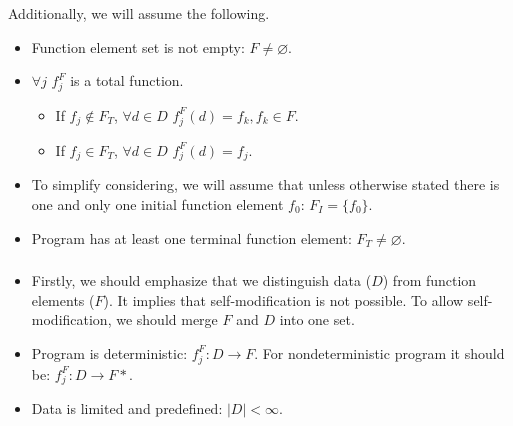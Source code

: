 \documentclass[oneside,a4paper]{article}  %
\newcommand{\subsublevel}{\subsubsection}
\newcommand{\ra}{\rightarrow}
\begin{document}
Additionally, we will assume the following.
\begin{itemize}
    \item Function element set is not empty: $F \neq \varnothing$.
    \item $\forall j \,\, f^F_j$ is a total function.
    \begin{itemize}
        \item If $f_j \notin F_T$,
            $\forall d \in D \,\, f^F_j(d) = f_k, f_k \in F$.
        \item If $f_j \in F_T$,
            $\forall d \in D \,\, f^F_j(d) = f_j$.
    \end{itemize}
    \item To simplify considering, we will assume that unless otherwise stated
        there is one and only one initial function element $f_0$:
        $F_I = \{f_0\}$.
    \item Program has at least one terminal function element:
        $F_T \neq \varnothing$.
\end{itemize}

\subsublevel*{
}


\begin{itemize}
    \item Firstly, we should emphasize that we distinguish data ($D$)
        from function elements ($F$).
        It implies that self-modification is not possible.
        To allow self-modification, we should merge $F$ and $D$ into one set.
    \item Program is deterministic: $f^F_j: D \ra F$.
        For nondeterministic program it should be: $f^F_j: D \ra F*$.
    \item Data is limited and predefined: $|D| < \infty$.
\end{itemize}

\subsublevel*{
}

\end{document}
